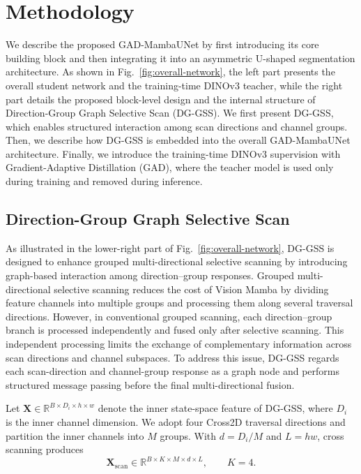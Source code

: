 \section{Methodology}
\label{sec:method}


We describe the proposed GAD-MambaUNet by first introducing its core building block and then integrating it into an asymmetric U-shaped segmentation architecture. 
As shown in Fig.~\ref{fig:overall-network}, the left part presents the overall student network and the training-time DINOv3 teacher, while the right part details the proposed block-level design and the internal structure of Direction-Group Graph Selective Scan (DG-GSS). 
We first present DG-GSS, which enables structured interaction among scan directions and channel groups. Then, we describe how DG-GSS is embedded into the overall GAD-MambaUNet architecture. Finally, we introduce the training-time DINOv3 supervision with Gradient-Adaptive Distillation (GAD), where the teacher model is used only during training and removed during inference.


\subsection{Direction-Group Graph Selective Scan}

As illustrated in the lower-right part of Fig.~\ref{fig:overall-network}, DG-GSS is designed to enhance grouped multi-directional selective scanning by introducing graph-based interaction among direction--group responses. Grouped multi-directional selective scanning reduces the cost of Vision Mamba by dividing feature channels into multiple groups and processing them along several traversal directions. However, in conventional grouped scanning, each direction--group branch is processed independently and fused only after selective scanning. This independent processing limits the exchange of complementary information across scan directions and channel subspaces. To address this issue, DG-GSS regards each scan-direction and channel-group response as a graph node and performs structured message passing before the final multi-directional fusion.

Let $\mathbf{X}\in\mathbb{R}^{B\times D_i\times h\times w}$ denote the inner state-space feature of DG-GSS, where $D_i$ is the inner channel dimension. We adopt four Cross2D traversal directions and partition the inner channels into $M$ groups. With $d=D_i/M$ and $L=hw$, cross scanning produces
\begin{equation}
\mathbf{X}_{\mathrm{scan}}\in\mathbb{R}^{B\times K\times M\times d\times L},\qquad K=4.
\end{equation}

